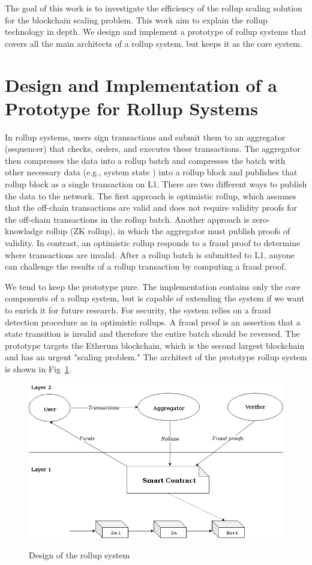 \documentclass{article}
\begin{document}
The goal of this work is to investigate the efficiency of the rollup scaling solution for the blockchain scaling problem. This work aim to explain the rollup technology in depth.  We design and implement a prototype of  rollup systems that covers all the main architects of a rollup system, but keeps it as the core system.

\section{Design and Implementation of a Prototype for Rollup Systems}
In rollup systems, users sign transactions and submit them to an aggregator (sequencer) that checks, orders, and executes these transactions. The aggregator then compresses the data into a rollup batch and compresses the batch with other necessary data (e.g., system state ) into a rollup block and publishes that rollup block as a single transaction on L1. There are two different ways to publish the data to the network. The first approach is optimistic rollup, which assumes that the off-chain transactions are valid and does not require validity proofs for the off-chain transactions in the rollup batch. Another approach is zero-knowladge rollup (ZK rollup), in which the aggregator must publish proofs of validity. In contrast, an optimistic rollup responds to a fraud proof to determine where transactions are invalid. After a rollup batch is submitted to L1, anyone can challenge the results of a rollup transaction by computing a fraud proof.

We tend to keep the prototype pure. The implementation contains only the core components of a rollup system, but is capable of extending the system if we want to enrich it for future research. For security, the system relies on a fraud detection procedure as in optimistic rollups. A fraud proof is an assertion that a state transition is invalid and therefore the entire batch should be reversed. The prototype targets the Etherum blockchain, which is the second largest blockchain and has an urgent "scaling problem." The architect of the prototype rollup system is shown in Fig~\ref{rollup-design}.

\begin{figure}[t]
\caption{Design of the rollup system}
\includegraphics[width=12cm]{rollup-design.png}
\centering
\label{rollup-design}
\end{figure}
\end{document}

